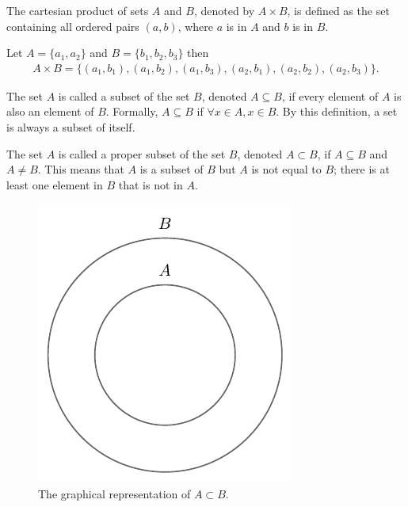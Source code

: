 \begin{definition}
	\label{def:cartesian_product}
	The cartesian product of sets $A$ and $B$, denoted by $A \times B$, is defined as the set containing all ordered pairs $(a, b)$, where $a$ is in $A$ and $b$ is in $B$.
\end{definition}

\begin{example}
	Let $A = \{a_1, a_2\}$ and $B = \{b_1, b_2, b_3\}$ then
	\begin{equation}
		\begin{split}
			A\times B = \{(a_1,b_1),(a_1,b_2),(a_1,b_3),(a_2,b_1),(a_2,b_2),(a_2,b_3)\}.
		\end{split}
	\end{equation}
\end{example}

\begin{definition}[Subset]
	\label{def:subset}
	The set $A$ is called a subset of the set $B$, denoted $A \subseteq B$, if every element of $A$ is also an element of $B$. Formally, $A\subseteq B$ if $\forall x \in A, x \in B$. By this definition, a set is always a subset of itself.
\end{definition}

\begin{definition}
	\label{def:proper_subset}
	The set $A$ is called a proper subset of the set $B$, denoted $A \subset B$, if $A \subseteq B$ and $A \neq B$. This means that $A$ is a subset of $B$ but $A$ is not equal to $B$; there is at least one element in $B$ that is not in $A$.
	\begin{figure}[H]
		\centering
		\includegraphics[]{figures/set_subset.pdf}
		\caption{The graphical representation of $A\subset B$.}
		\label{fig:set_subset}
	\end{figure}
\end{definition}

